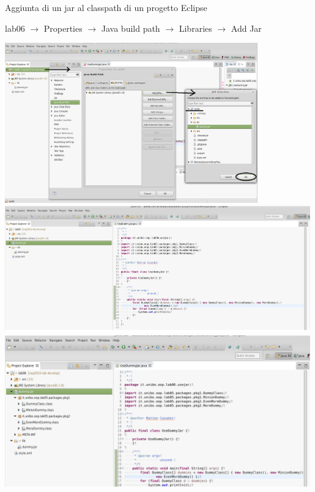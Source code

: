 \documentclass[presentation]{beamer}
\begin{document}
\begin{frame}[allowframebreaks]{Aggiunta di un jar al classpath di un progetto Eclipse}
	\begin{block}{}
		lab06 $\rightarrow$ Properties $\rightarrow$ Java build path $\rightarrow$ Libraries $\rightarrow$ Add Jar
	\end{block}
	\begin{center}
		\includegraphics[width=0.82\textwidth]{img/addjar-1} \\
		\includegraphics[width=0.99\textwidth]{img/addjar-2} \\
		\includegraphics[width=0.99\textwidth]{img/addjar-3} \\
	\end{center}
\end{frame}
\end{document}
